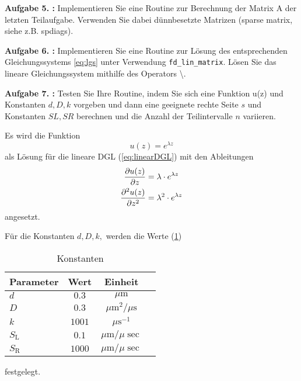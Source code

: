 \begin{mybox}
	\textbf{Aufgabe 5. :} Implementieren Sie eine Routine zur Berechnung
	der Matrix A der letzten Teilaufgabe. Verwenden
	Sie dabei dünnbesetzte Matrizen (sparse matrix, siehe z.B. spdiags).
\end{mybox}



\begin{mybox}
	\textbf{Aufgabe 6. :}
	Implementieren Sie eine Routine zur Lösung des entsprechenden
	Gleichungssystems \cref{eq:lgs} unter Verwendung
	\verb*|fd_lin_matrix|. Lösen Sie das lineare Gleichungssystem mithilfe des
	Operators \textbackslash .
\end{mybox}



\begin{mybox}
	\textbf{Aufgabe 7. :} Testen Sie Ihre Routine, indem Sie sich eine
	Funktion u(z) und Konstanten $d, D, k$ vorgeben und
	dann eine geeignete rechte Seite $s$ und Konstanten $SL, SR$ berechnen
	und die Anzahl der Teilintervalle
	$n$ variieren.
\end{mybox}
Es wird die Funktion
\begin{equation}\label{eq:ladungstraegerdichte}
	u(z)=e^{\lambda z}
\end{equation}
als Lösung für die lineare DGL (\cref{eq:linearDGL}) mit den Ableitungen
\begin{align}\label{eq:fundamental_ableitung}
	\pdv{u(z)}{z}    & =\lambda \cdot e^{\lambda z}   \\
	\pdv[2]{u(z)}{z} & =\lambda^2 \cdot e^{\lambda z}
\end{align}
angesetzt.

Für die Konstanten  $d, D, k,$ werden die Werte (\cref{t:const})
\begin{table}
	\centering
	\caption{Konstanten}
	\label{t:const}
	\begin{tabular}{lccc}
		\toprule

		Parameter      & Wert   & Einheit                        \\
		\midrule
		$d$            & $0.3$  & $\si{\mu\meter}$               \\

		$D$            & $0.3$  & $\si{\mu\square\m\per \mu \s}$ \\

		$k$            & $1001$ & $\si{\mu\second^{-1}}$         \\

		$S_\mathrm{L}$ & $0.1$  & $\si{\mu\m\per\mu\sec}$        \\

		$S_\mathrm{R}$ & $1000$ & $\si{\mu\m\per\mu\sec}$        \\
		\bottomrule

	\end{tabular}

\end{table}
festgelegt.

